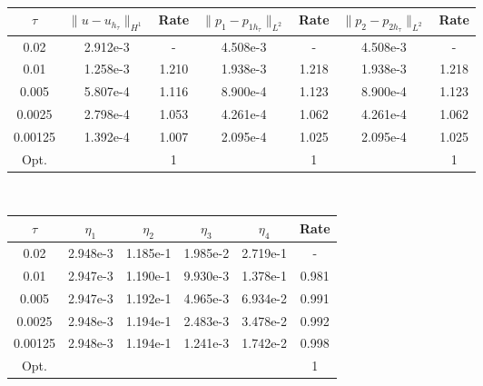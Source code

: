 \mbox{}\\
\begin{center} 
\centering
\small
\begin{tabular}{c|c|c|c|c|c|c}
$\tau$ & $\|u-u_{h_{\tau}}\|_{H^1}$ & Rate & $\|p_1-p_{1h_{\tau}}\|_{L^2}$ & Rate & $\|p_2-p_{2h_{\tau}}\|_{L^2}$ & Rate \\\hline
0.02   	& 2.912e-3 & -     & 4.508e-3 & -     & 4.508e-3 &  -    \\
0.01   	& 1.258e-3 & 1.210 & 1.938e-3 & 1.218 & 1.938e-3 & 1.218 \\
0.005  	& 5.807e-4 & 1.116 & 8.900e-4 & 1.123 & 8.900e-4 & 1.123 \\
0.0025  & 2.798e-4 & 1.053 & 4.261e-4 & 1.062 & 4.261e-4 & 1.062 \\
0.00125 & 1.392e-4 & 1.007 & 2.095e-4 & 1.025 & 2.095e-4 & 1.025 \\ \hline
Opt. & & 1 & & 1  & & 1
\end{tabular}
\normalsize
{} \label{tab:bb_no_transfer_time_error}
\end{center}

\mbox{}\\

\begin{center} 
\centering
\begin{tabular}{c|c|c|c|c|c}
$\tau$ & $\eta_1$ & $\eta_2$ & $\eta_3$ & $\eta_4$ & Rate\\\hline
0.02    & 2.948e-3 & 1.185e-1 & 1.985e-2 & 2.719e-1 & -    \\
0.01    & 2.947e-3 & 1.190e-1 & 9.930e-3 & 1.378e-1 & 0.981\\
0.005   & 2.947e-3 & 1.192e-1 & 4.965e-3 & 6.934e-2 & 0.991\\
0.0025  & 2.948e-3 & 1.194e-1 & 2.483e-3 & 3.478e-2 & 0.992\\
0.00125 & 2.948e-3 & 1.194e-1 & 1.241e-3 & 1.742e-2 & 0.998\\\hline
Opt. & & & & & 1
\end{tabular}
 \label{tab:bb_no_transfer_time_est}
\end{center}

